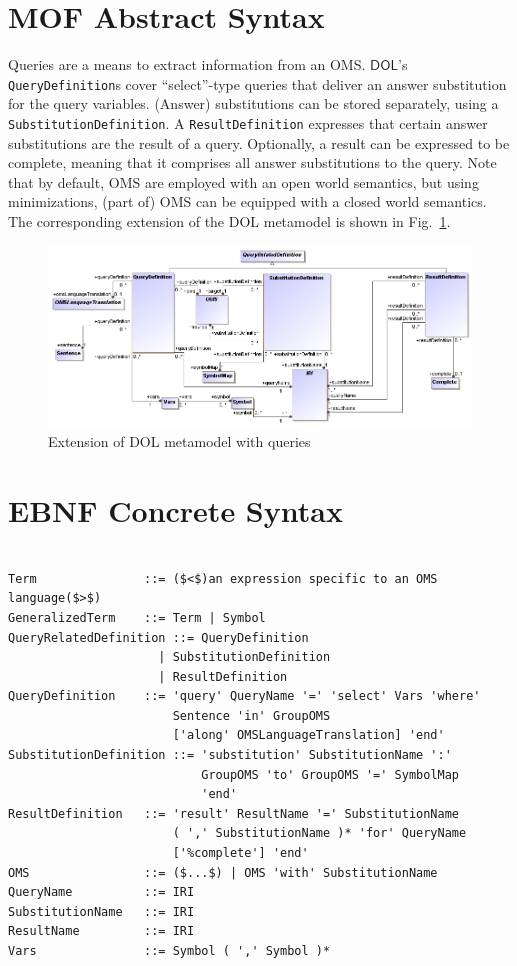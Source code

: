 \documentclass[10pt,fleqn,final]{scrreprt}
\newcommand*{\syntax}[1]{\texttt{#1}}
\newcommand*{\DOL}{\ensuremath{\mathsf{DOL}}\xspace}
\newcommand{\sclause}[1]{\section{#1}}
\begin{document}
\sclause{MOF Abstract Syntax}
Queries are a means to extract information from an OMS.  \DOL's \syntax{QueryDefinition}s cover 
``select''-type queries that deliver an answer substitution for the query variables. (Answer) 
substitutions can be stored separately, using a \syntax{SubstitutionDefinition}. A
\syntax{ResultDefinition} expresses that certain answer substitutions are
the result of a query. Optionally, a result can be expressed to be
complete, meaning that it comprises all answer substitutions to the query.
 Note that by default, OMS are employed with an open world semantics,
but using minimizations, (part of) OMS can be equipped with a closed
world semantics. The corresponding extension of the DOL metamodel is shown
in Fig.~\ref{fig:queries}.

\begin{figure}
    \centering
      \includegraphics[scale=0.5]{mof/queries.png}
     \caption{Extension of DOL metamodel with queries}
    \label{fig:queries} 
\end{figure}

\sclause{EBNF Concrete Syntax}

\begin{lstlisting}[language=ebnf,escapeinside={()},mathescape]

Term               ::= ($<$)an expression specific to an OMS language($>$) 
GeneralizedTerm    ::= Term | Symbol
QueryRelatedDefinition ::= QueryDefinition
                     | SubstitutionDefinition
                     | ResultDefinition
QueryDefinition    ::= 'query' QueryName '=' 'select' Vars 'where'
                       Sentence 'in' GroupOMS
                       ['along' OMSLanguageTranslation] 'end'
SubstitutionDefinition ::= 'substitution' SubstitutionName ':'
                           GroupOMS 'to' GroupOMS '=' SymbolMap
                           'end'
ResultDefinition   ::= 'result' ResultName '=' SubstitutionName
                       ( ',' SubstitutionName )* 'for' QueryName
                       ['%complete'] 'end'
OMS                ::= ($...$) | OMS 'with' SubstitutionName 
QueryName          ::= IRI
SubstitutionName   ::= IRI
ResultName         ::= IRI
Vars               ::= Symbol ( ',' Symbol )*
\end{lstlisting}
\end{document}
